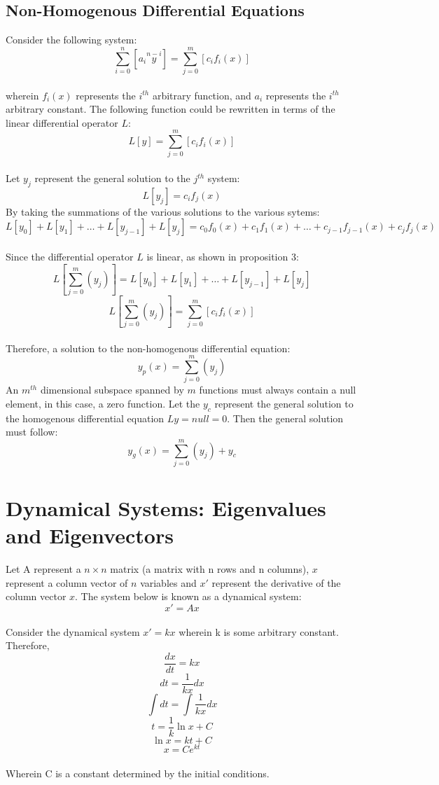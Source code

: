 \documentclass[a4paper, 12pt]{report}
\def\f{\frac}
\def\l{\left}
\def\r{\right}
\let\stdsection\section
\renewcommand\section{\newpage\stdsection}
\begin{document}
\begin{center}
\subsection{Non-Homogenous Differential Equations}
Consider the following system:
$$\sum_{i = 0}^{n}\l[a_i \overset{n - i}{y}\r] = \sum_{j = 0}^{m}\l[c_i f_i(x)\r]$$
\\wherein $f_i(x)$ represents the $i^{th}$ arbitrary function, and $a_i$ represents the $i^{th}$ arbitrary constant. The following function could be rewritten in terms of the linear differential operator $L$:
$$L[y] = \sum_{j = 0}^{m}\l[c_i f_i(x)\r]$$
\\Let $y_j$ represent the general solution to the $j^{th}$ system:
$$L[y_j] = c_i f_j(x)$$
By taking the summations of the various solutions to the various sytems:
$$L[y_0] + L[y_1] + \dots +L[y_{j - 1}] + L[y_j] = c_0 f_0(x) + c_1 f_1(x) + \dots + c_{j - 1} f_{j - 1}(x) + c_{j} f_j(x)$$
\\Since the differential operator $L$ is linear, as shown in proposition 3: 
$$L\l[\sum_{j = 0}^{m}\l(y_j\r)\r] = L[y_0] + L[y_1] + \dots +L[y_{j - 1}] + L[y_j]$$
$$L\l[\sum_{j = 0}^{m}\l(y_j\r)\r] =  \sum_{j = 0}^{m}\l[c_i f_i(x)\r] $$
\\Therefore, a solution to the non-homogenous differential equation:
$$y_p(x) = \sum_{j = 0}^{m}\l(y_j\r)$$ 
An $m^{th}$ dimensional subspace spanned by $m$ functions must always contain a null element, in this case, a zero function. Let the $y_c$ represent the general solution to the homogenous differential equation $Ly = null = 0$. Then the general solution must follow:
$$y_g(x) = \sum_{j = 0}^{m}\l(y_j\r) + y_c$$
\section{Dynamical Systems: Eigenvalues and Eigenvectors}
Let A represent a $n \times n$ matrix (a matrix with n rows and n columns), $x$ represent a column vector of $n$ variables and $x'$ represent the derivative of the column vector $x$. The system below is known as a dynamical system:
$$x' = Ax$$   
\\Consider the dynamical system $x' = kx$ wherein k is some arbitrary constant. Therefore,
$$\f{dx}{dt} = kx$$
$$dt = \f{1}{kx}dx$$
$$\int dt = \int \f{1}{kx}dx$$
$$t = \f{1}{k}\ln{x}+ C$$
$$\ln{x} = kt + C$$
$$x = Ce^{kt}$$
\\Wherein C is a constant determined by the initial conditions.

\end{center}
\end{document}
